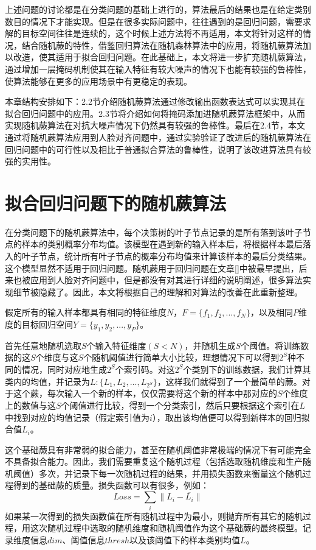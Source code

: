 上述问题的讨论都是在分类问题的基础上进行的，算法最后的结果也是在给定类别数目的情况下才能实现。但是在很多实际问题中，往往遇到的是回归问题，需要求解的目标空间往往是连续的，这个时候上述方法将不再适用，本文将针对这样的情况，结合随机蕨的特性，借鉴回归算法在随机森林算法中的应用，将随机蕨算法加以改造，使其适用于拟合回归问题。在此基础上，本文将进一步扩充随机蕨算法，通过增加一层掩码机制使其在输入特征有较大噪声的情况下也能有较强的鲁棒性，使算法能够在更多的应用场景中有更稳定的表现。

本章结构安排如下：2.2节介绍随机蕨算法通过修改输出函数表达式可以实现其在拟合回归问题中的应用。2.3节将介绍如何将掩码添加进随机蕨算法框架中，从而实现随机蕨算法在对抗大噪声情况下仍然具有较强的鲁棒性。最后在2.4节，本文通过将随机蕨算法应用到人脸对齐问题中，通过实验验证了改进后的随机蕨算法在回归问题中的可行性以及相比于普通拟合算法的鲁棒性，说明了该改进算法具有较强的实用性。

\section{拟合回归问题下的随机蕨算法}
在分类问题下的随机蕨算法中，每个决策树的叶子节点记录的是所有落到该叶子节点的样本的类别概率分布均值。该模型在遇到新的输入样本后，将根据样本最后落入的叶子节点，统计所有叶子节点的概率分布均值来计算该样本的最后分类结果。这个模型显然不适用于回归问题。随机蕨用于回归问题在文章[]中被最早提出，后来也被应用到人脸对齐问题中\cite{cao2014face}，但是都没有对其进行详细的说明阐述，很多算法实现细节被隐藏了。因此，本文将根据自己的理解和对算法的改善在此重新整理。

假定所有的输入样本都具有相同的特征维度$N$，$F=\{f_1,f_2,...,f_N\}$，以及相同$P$维度的目标回归空间$Y=\{y_1,y_2,...,y_P\}$。

首先任意地随机选取$S$个输入特征维度$(S<N)$，并随机生成$S$个阈值。将训练数据的这$S$个维度与这$S$个随机阈值进行简单大小比较，理想情况下可以得到$2^S$种不同的情况，同时对应地生成$2^S$个索引码。对这$2^S$个类别下的训练数据，我们计算其类内的均值，并记录为$L:\{L_1,L_2,...,L_{2^S}\}$，这样我们就得到了一个最简单的蕨。对于这个蕨，每次输入一个新的样本，仅仅需要将这个新的样本中那对应的$S$个维度上的数值与这$S$个阈值进行比较，得到一个分类索引，然后只要根据这个索引在$L$中找到对应的均值记录（假定索引值为$i$），取出该均值便可以得到新样本的回归拟合值$L_i$。

这个基础蕨具有非常弱的拟合能力，甚至在随机阈值非常极端的情况下有可能完全不具备拟合能力。因此，我们需要重复这个随机过程（包括选取随机维度和生产随机阈值）多次，并记录下每一次随机过程的结果，并用损失函数来衡量这个随机过程得到的基础蕨的质量。损失函数可以有很多，例如：
\begin{equation}
	Loss=\sum_i{\|L_i-\overline{L_i}\|}
\end{equation}
如果某一次得到的损失函数值在所有随机过程中为最小，则抛弃所有其它的随机过程，用这次随机过程中选取的随机维度和随机阈值作为这个基础蕨的最终模型。记录维度信息$dim$、阈值信息$thresh$以及该阈值下的样本类别均值$L$。

